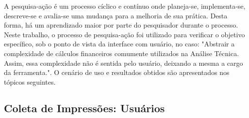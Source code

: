 A pesquisa-ação é um processo cíclico e contínuo onde planeja-se, implementa-se, descreve-se e avalia-se uma mudança para a melhoria de sua prática. Desta forma, há um aprendizado maior por parte do pesquisador durante o processo. Neste trabalho, o processo de pesquisa-ação foi utilizado para verificar o objetivo específico, sob o ponto de vista da interface com usuário, no caso: "Abstrair a complexidade de cálculos financeiros comumente utilizados na Análise Técnica. Assim, essa complexidade não é sentida pelo usuário, deixando a mesma a cargo da ferramenta.". O cenário de uso e resultados obtidos são apresentados nos tópicos seguintes.

\subsection{Coleta de Impressões: Usuários}

